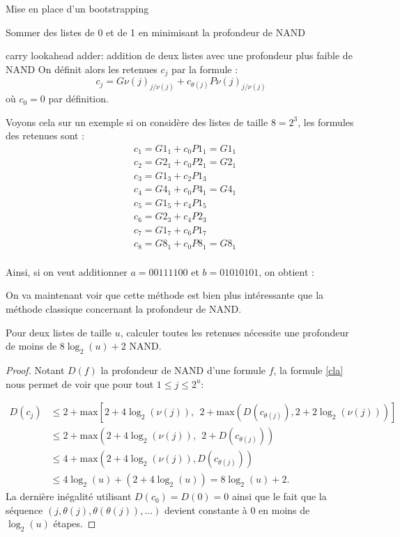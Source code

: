 \begin{section}{Mise en place d'un bootstrapping}
\begin{subsection}{Sommer des listes de 0 et de 1 en minimisant la profondeur de NAND}
\begin{subsubsection}{carry lookahead adder: addition de deux listes avec une profondeur plus faible de NAND}
	On définit alors les retenues $c_j$ par la formule :
\begin{equation}
\label{cla}
c_j = {G\nu(j)}_{j/\nu(j)} + c_{\theta(j)} {P\nu(j)}_{j/\nu(j)}
\end{equation}
	où $c_0 = 0$ par définition.

	Voyons cela sur un exemple si on considère des listes de taille $8 = 2^3$, les formules des retenues sont :
\begin{align*}
&c_1 = {G1_1} + c_0 {P1_1} = {G1_1} \\
&c_2 = {G2_1} + c_0 {P2_1} = {G2_1}  \\
&c_3 = {G1_3} + c_2 {P1_3}\\
&c_4 = {G4_1} + c_0 {P4_1} = {G4_1} \\
&c_5 = {G1_5} + c_4 {P1_5}\\
&c_6 = {G2_3} + c_4 {P2_3} \\
&c_7 = {G1_7} + c_6 {P1_7} \\
&c_8 = {G8_1} + c_0 {P8_1} = {G8_1} \\
\end{align*}

	Ainsi, si on veut additionner $a = 00111100$ et $b = 01010101$, on obtient :
\begin{center}
      \begin{tikzpicture}[scale = 1, transform shape]
      	
      \end{tikzpicture}
\end{center}

	On va maintenant voir que cette méthode est bien plus intéressante que la méthode classique concernant la profondeur de NAND.
\begin{prop}
	Pour deux listes de taille $u$, calculer toutes les retenues nécessite une profondeur de moins de $8 \log_2(u) + 2$ NAND.
\end{prop}

\begin{proof}
	Notant $D(f)$ la profondeur de NAND d'une formule $f$, la formule \eqref{cla} nous permet de voir que pour tout $1 \leqslant j \leqslant 2^u $:

\begin{align*}
D(c_j) &\leqslant 2 + \text{max}\left[2 + 4 \log_2(\nu(j)),\:\: 2 + \text{max}\left(D(c_{\theta(j)}), 2 + 2
\log_2(\nu(j))\right)\right] \\
&\leqslant 2 + \text{max}\left(2 + 4 \log_2(\nu(j)),\:\: 2 + D(c_{\theta(j)})\right) \\
&\leqslant 4 + \text{max}\left(2 + 4 \log_2(\nu(j)), D(c_{\theta(j)})\right) \\
& \leqslant 4 \log_2(u) + (2 + 4\log_2(u)) = 8 \log_2(u) + 2.
\end{align*}
La dernière inégalité utilisant $D(c_0) = D(0) = 0$ ainsi que le fait que la séquence $(j, \theta(j), \theta(\theta(j)),
...)$ devient constante à 0 en moins de $\log_2(u)$ étapes. 


\end{proof}
\end{subsubsection}
\end{subsection}
\end{section}
